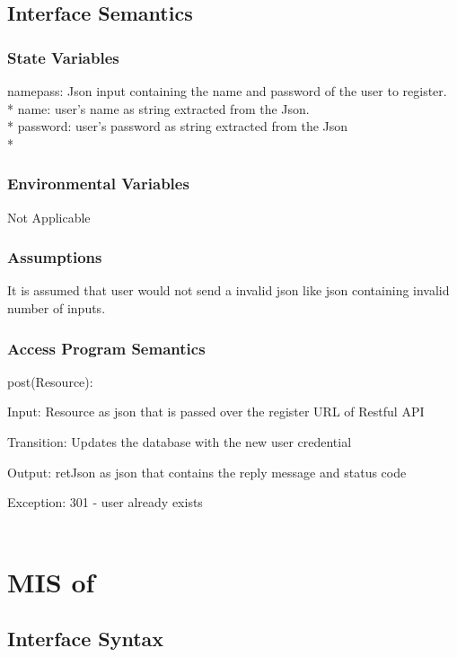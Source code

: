 \documentclass[12,english]{article}
\begin{document}
		\subsection{Interface Semantics}
			\subsubsection{State Variables}
			namepass: Json input containing the name and password of the user to register.  \\*
			name: user's name as string extracted from the Json.   \\*
			password: user's password as string extracted from the Json    \\*
			
			\subsubsection{Environmental Variables}
			Not Applicable
			
			\subsubsection{Assumptions}
           It is assumed that user would not send a invalid json like json containing invalid number of inputs.
        
			\subsubsection{Access Program Semantics}
			post(Resource):
			
			Input: Resource as json that is passed over the register URL of Restful API
			
			Transition: Updates the database with the new user credential
			
			Output: retJson as json that contains the reply message and status code
			
			Exception: 301 - user already exists\\
			\\
			
			
			
			
\section{MIS of }
		\subsection{Interface Syntax}
\end{document}
